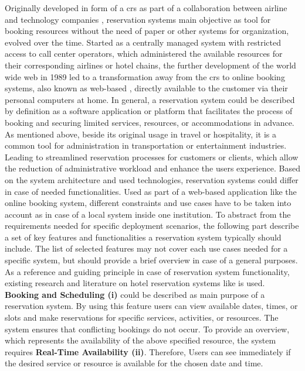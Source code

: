 Originally developed in form of a \acrfull{crs} as part of a collaboration between airline and technology companies \cite{xiang_evolution_2020}, reservation systems main objective as tool for booking resources without the need of paper or other systems for organization, evolved over the time.
Started as a centrally managed system with restricted access to call center operators, which administered the available resources for their corresponding airlines or hotel chains, the further development of the world wide web in 1989 led to a transformation away from the \acrshort{crs} to online booking systems, also known as web-based , directly available to the customer via their personal computers at home.
In general, a reservation system could be described by definition as a software application or platform that facilitates the process of booking and securing limited services, resources, or accommodations in advance. 
As mentioned above, beside its original usage in travel or hospitality, it is a common tool for administration in transportation or entertainment industries. 
Leading to streamlined reservation processes for customers or clients, which allow the reduction of administrative workload and enhance the users experience.
Based on the system architecture and used technologies, reservation systems could differ in case of needed functionalities. Used as part of a web-based application like the online booking system, different constraints and use cases have to be taken into account as in case of a local system inside one institution. 
To abstract from the requirements needed for specific deployment scenarios, the following part describe a set of key features and functionalities a reservation system typically should include. The list of selected features may not cover each use cases needed for a specific system, but should provide a brief overview in case of a general purposes.
As a reference and guiding principle in case of reservation system functionality, existing research and literature on hotel reservation systems like \cite{delizo_online_2013, bemile_online_nodate} is used.
\textbf{Booking and Scheduling (i)} could be described as main purpose of a reservation system. By using this feature users can view available dates, times, or slots and make reservations for specific services, activities, or resources. The system ensures that conflicting bookings do not occur.
To provide an overview, which represents the availability of the above specified resource, the system requires \textbf{Real-Time Availability (ii)}. Therefore, Users can see immediately if the desired service or resource is available for the chosen date and time.
